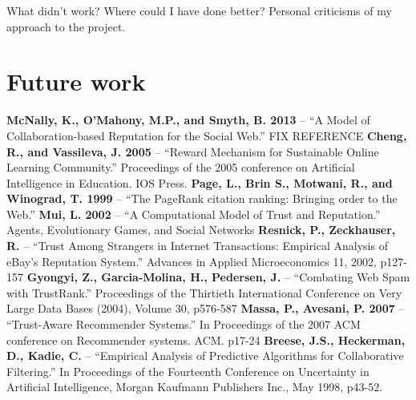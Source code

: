 \documentclass[]{final_report}
\begin{document}
What didn't work? Where could I have done better? Personal criticisms of my approach to the project.

\section{Future work}



\newpage
\raggedright
\textbf{McNally, K., O'Mahony, M.P., and Smyth, B. 2013} -- ``A Model of Collaboration-based Reputation for the Social Web.'' FIX REFERENCE
\linebreak
\linebreak
\textbf{Cheng, R., and Vassileva, J. 2005} -- ``Reward Mechanism for Sustainable Online Learning Community.'' Proceedings of the 2005 conference on Artificial Intelligence in Education. IOS Press.
\linebreak
\linebreak
\textbf{Page, L., Brin S., Motwani, R., and Winograd, T. 1999} -- ``The PageRank citation ranking: Bringing order to the Web.''
\linebreak
\linebreak
\textbf{Mui, L. 2002} -- ``A Computational Model of Trust and Reputation.'' Agents, Evolutionary Games, and Social Networks
\linebreak
\linebreak
\textbf{Resnick, P., Zeckhauser, R.} -- ``Trust Among Strangers in Internet Transactions: Empirical Analysis of eBay's Reputation System.'' Advances in Applied Microeconomics 11, 2002, p127-157
\linebreak
\linebreak
\textbf{Gyongyi, Z., Garcia-Molina, H., Pedersen, J.} -- ``Combating Web Spam with TrustRank.'' Proceedings of the Thirtieth International Conference on Very Large Data Bases (2004), Volume 30, p576-587
\linebreak
\linebreak
\textbf{Massa, P., Avesani, P. 2007} -- ``Trust-Aware Recommender Systems.'' In Proceedings of the 2007 ACM conference on Recommender systems. ACM. p17-24
\linebreak
\linebreak
\textbf{Breese, J.S., Heckerman, D., Kadie, C.} -- ``Empirical Analysis of Predictive Algorithms for Collaborative Filtering.'' In Proceedings of the Fourteenth Conference on Uncertainty in Artificial Intelligence, Morgan Kaufmann Publishers Inc., May 1998, p43-52.
\end{document}

